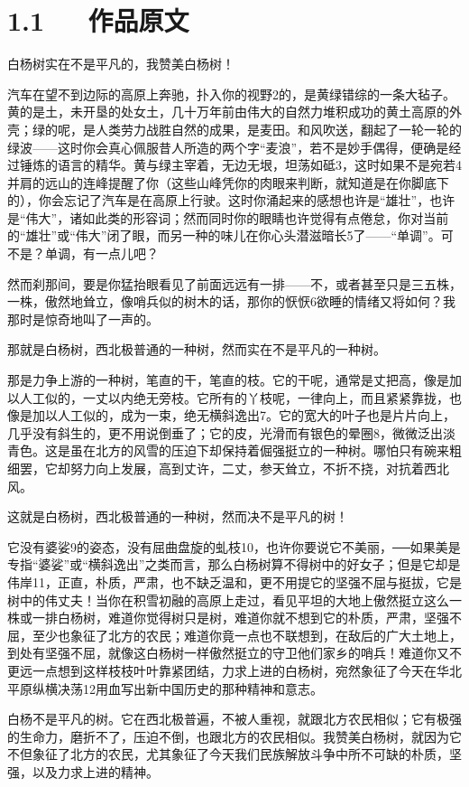 \documentclass[letterpaper,10pt,english]{sphinxmanual}
\begin{document}
\section{1.1   作品原文}
\label{\detokenize{p01_u6563_u6587/_u8305_u76fe-_u767d_u6768_u793c_u8d5e:id3}}
白杨树实在不是平凡的，我赞美白杨树！

汽车在望不到边际的高原上奔驰，扑入你的视野2的，是黄绿错综的一条大毡子。黄的是土，未开垦的处女土，几十万年前由伟大的自然力堆积成功的黄土高原的外壳；绿的呢，是人类劳力战胜自然的成果，是麦田。和风吹送，翻起了一轮一轮的绿波——这时你会真心佩服昔人所造的两个字“麦浪”，若不是妙手偶得，便确是经过锤炼的语言的精华。黄与绿主宰着，无边无垠，坦荡如砥3，这时如果不是宛若4并肩的远山的连峰提醒了你（这些山峰凭你的肉眼来判断，就知道是在你脚底下的），你会忘记了汽车是在高原上行驶。这时你涌起来的感想也许是“雄壮”，也许是“伟大”，诸如此类的形容词；然而同时你的眼睛也许觉得有点倦怠，你对当前的“雄壮”或“伟大”闭了眼，而另一种的味儿在你心头潜滋暗长5了——“单调”。可不是？单调，有一点儿吧？

然而刹那间，要是你猛抬眼看见了前面远远有一排——不，或者甚至只是三五株，一株，傲然地耸立，像哨兵似的树木的话，那你的恹恹6欲睡的情绪又将如何？我那时是惊奇地叫了一声的。

那就是白杨树，西北极普通的一种树，然而实在不是平凡的一种树。

那是力争上游的一种树，笔直的干，笔直的枝。它的干呢，通常是丈把高，像是加以人工似的，一丈以内绝无旁枝。它所有的丫枝呢，一律向上，而且紧紧靠拢，也像是加以人工似的，成为一束，绝无横斜逸出7。它的宽大的叶子也是片片向上，几乎没有斜生的，更不用说倒垂了；它的皮，光滑而有银色的晕圈8，微微泛出淡青色。这是虽在北方的风雪的压迫下却保持着倔强挺立的一种树。哪怕只有碗来粗细罢，它却努力向上发展，高到丈许，二丈，参天耸立，不折不挠，对抗着西北风。

这就是白杨树，西北极普通的一种树，然而决不是平凡的树！

它没有婆娑9的姿态，没有屈曲盘旋的虬枝10，也许你要说它不美丽，──如果美是专指“婆娑”或“横斜逸出”之类而言，那么白杨树算不得树中的好女子；但是它却是伟岸11，正直，朴质，严肃，也不缺乏温和，更不用提它的坚强不屈与挺拔，它是树中的伟丈夫！当你在积雪初融的高原上走过，看见平坦的大地上傲然挺立这么一株或一排白杨树，难道你觉得树只是树，难道你就不想到它的朴质，严肃，坚强不屈，至少也象征了北方的农民；难道你竟一点也不联想到，在敌后的广大土地上，到处有坚强不屈，就像这白杨树一样傲然挺立的守卫他们家乡的哨兵！难道你又不更远一点想到这样枝枝叶叶靠紧团结，力求上进的白杨树，宛然象征了今天在华北平原纵横决荡12用血写出新中国历史的那种精神和意志。

白杨不是平凡的树。它在西北极普遍，不被人重视，就跟北方农民相似；它有极强的生命力，磨折不了，压迫不倒，也跟北方的农民相似。我赞美白杨树，就因为它不但象征了北方的农民，尤其象征了今天我们民族解放斗争中所不可缺的朴质，坚强，以及力求上进的精神。
\end{document}
